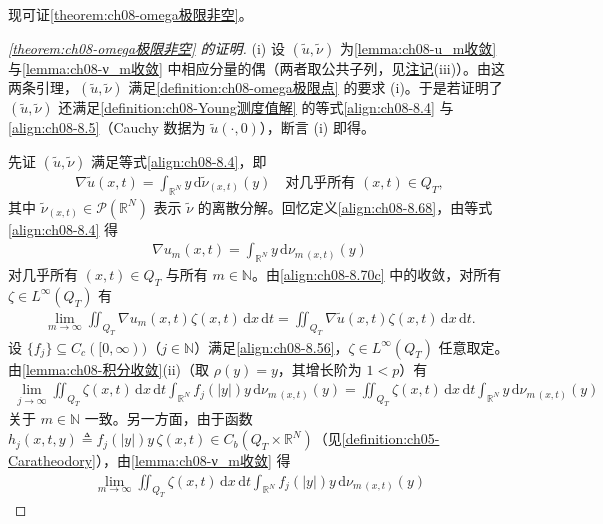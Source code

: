 \documentclass[../../main.tex]{subfiles}%
\begin{document}
现可证\cref{theorem:ch08-omega极限非空}。

\begin{proof}[\cref{theorem:ch08-omega极限非空} 的证明]
(i) 设 $(\tilde u,\tilde\nu)$ 为\cref{lemma:ch08-u_m收敛} 与\cref{lemma:ch08-ν_m收敛} 中相应分量的偶（两者取公共子列，见\hyperref[remark:ch08-ν_m收敛]{注记}(iii)）。由这两条引理，$(\tilde u,\tilde\nu)$ 满足\cref{definition:ch08-omega极限点} 的要求 (i)。于是若证明了 $(\tilde u,\tilde\nu)$ 还满足\cref{definition:ch08-Young测度值解} 的等式\eqref{align:ch08-8.4} 与\eqref{align:ch08-8.5}（Cauchy 数据为 $\tilde u(\cdot,0)$），断言 (i) 即得。

先证 $(\tilde u,\tilde\nu)$ 满足等式\eqref{align:ch08-8.4}，即
\begin{align}
\nabla\tilde u(x,t)=\int_{\mathbb{R}^N}y\,\mathrm{d}\tilde\nu_{(x,t)}(y)
\quad\text{对几乎所有 }(x,t)\in Q_T, \label{align:ch08-8.81}
\end{align}
其中 $\tilde\nu_{(x,t)}\in\mathcal{P}(\mathbb{R}^N)$ 表示 $\tilde\nu$ 的离散分解。回忆定义\eqref{align:ch08-8.68}，由等式\eqref{align:ch08-8.4} 得
\begin{align}
\nabla u_m(x,t)=\int_{\mathbb{R}^N}y\,\mathrm{d}\nu_{m\,(x,t)}(y) \label{align:ch08-8.82}
\end{align}
对几乎所有 $(x,t)\in Q_T$ 与所有 $m\in\mathbb{N}$。由\eqref{align:ch08-8.70c} 中的收敛，对所有 $\zeta\in L^\infty(Q_T)$ 有
\begin{align}
\lim_{m\to\infty}\iint_{Q_T}\nabla u_m(x,t)\zeta(x,t)\,\mathrm{d}x\,\mathrm{d}t
=\iint_{Q_T}\nabla\tilde u(x,t)\zeta(x,t)\,\mathrm{d}x\,\mathrm{d}t. \label{align:ch08-8.83}
\end{align}
设 $\{f_j\}\subseteq C_c([0,\infty))$（$j\in\mathbb{N}$）满足\eqref{align:ch08-8.56}，$\zeta\in L^\infty(Q_T)$ 任意取定。由\cref{lemma:ch08-积分收敛}(ii)（取 $\rho(y)=y$，其增长阶为 $1<p$）有
\begin{align}
\lim_{j\to\infty}\iint_{Q_T}\zeta(x,t)\,\mathrm{d}x\,\mathrm{d}t\int_{\mathbb{R}^N}f_j(|y|)y\,\mathrm{d}\nu_{m\,(x,t)}(y)
=\iint_{Q_T}\zeta(x,t)\,\mathrm{d}x\,\mathrm{d}t\int_{\mathbb{R}^N}y\,\mathrm{d}\nu_{m\,(x,t)}(y) \label{align:ch08-8.84}
\end{align}
关于 $m\in\mathbb{N}$ 一致。另一方面，由于函数 $h_j(x,t,y)\triangleq f_j(|y|)y\,\zeta(x,t)\in C_b(Q_T\times\mathbb{R}^N)$（见\cref{definition:ch05-Caratheodory}），由\cref{lemma:ch08-ν_m收敛} 得
\begin{align}
\lim_{m\to\infty}\iint_{Q_T}\zeta(x,t)\,\mathrm{d}x\,\mathrm{d}t\int_{\mathbb{R}^N}f_j(|y|)y\,\mathrm{d}\nu_{m\,(x,t)}(y)

\end{align}
\end{proof}
\end{document}
